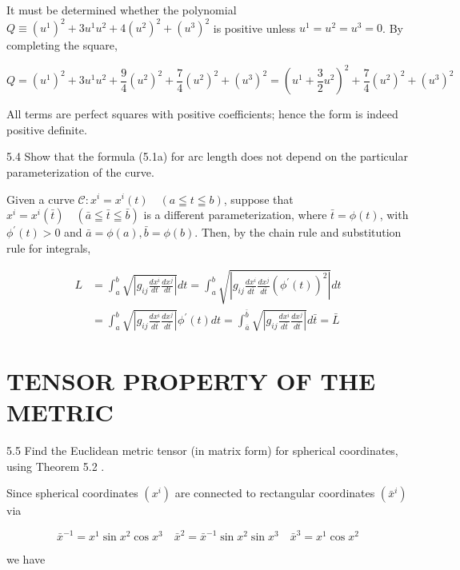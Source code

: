 \documentclass[10pt]{article}
\begin{document}
It must be determined whether the polynomial $Q \equiv\left(u^{1}\right)^{2}+3 u^{1} u^{2}+4\left(u^{2}\right)^{2}+\left(u^{3}\right)^{2}$ is positive unless $u^{1}=u^{2}=u^{3}=0$. By completing the square,

$$
Q=\left(u^{1}\right)^{2}+3 u^{1} u^{2}+\frac{9}{4}\left(u^{2}\right)^{2}+\frac{7}{4}\left(u^{2}\right)^{2}+\left(u^{3}\right)^{2}=\left(u^{1}+\frac{3}{2} u^{2}\right)^{2}+\frac{7}{4}\left(u^{2}\right)^{2}+\left(u^{3}\right)^{2}
$$

All terms are perfect squares with positive coefficients; hence the form is indeed positive definite.

5.4 Show that the formula (5.1a) for arc length does not depend on the particular parameterization of the curve.

Given a curve $\mathscr{C}: x^{i}=x^{i}(t) \quad(a \leqq t \leqq b)$, suppose that $x^{i}=x^{i}(\bar{t}) \quad(\bar{a} \leqq \bar{t} \leqq \bar{b})$ is a different parameterization, where $\bar{t}=\phi(t)$, with $\phi^{\prime}(t)>0$ and $\bar{a}=\phi(a), \bar{b}=\phi(b)$. Then, by the chain rule and substitution rule for integrals,

$$
\begin{aligned}
L & =\int_{a}^{b} \sqrt{\left|g_{i j} \frac{d x^{i}}{d t} \frac{d x^{j}}{d t}\right|} d t=\int_{a}^{b} \sqrt{\left|g_{i j} \frac{d x^{i}}{d \bar{t}} \frac{d x^{j}}{d \bar{t}}\left(\phi^{\prime}(t)\right)^{2}\right|} d t \\
& =\int_{a}^{b} \sqrt{\left|g_{i j} \frac{d x^{i}}{d \bar{t}} \frac{d x^{j}}{d \bar{t}}\right|} \phi^{\prime}(t) d t=\int_{\bar{a}}^{\bar{b}} \sqrt{\left|g_{i j} \frac{d x^{i}}{d \bar{t}} \frac{d x^{j}}{d \bar{t}}\right|} d \bar{t}=\bar{L}
\end{aligned}
$$

\section*{TENSOR PROPERTY OF THE METRIC}
5.5 Find the Euclidean metric tensor (in matrix form) for spherical coordinates, using Theorem 5.2 .

Since spherical coordinates $\left(x^{i}\right)$ are connected to rectangular coordinates $\left(\bar{x}^{i}\right)$ via

$$
\bar{x}^{-1}=x^{1} \sin x^{2} \cos x^{3} \quad \bar{x}^{2}=\bar{x}^{-1} \sin x^{2} \sin x^{3} \quad \bar{x}^{3}=x^{1} \cos x^{2}
$$

we have
\end{document}
